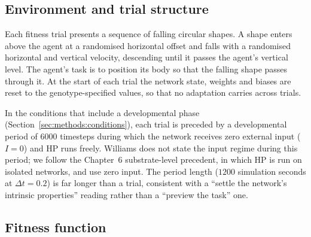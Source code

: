 \subsection{Environment and trial structure}
\label{sec:methods:env}

Each fitness trial presents a sequence of falling circular shapes. A shape
enters above the agent at a randomised horizontal offset and falls with a
randomised horizontal and vertical velocity, descending until it passes the
agent's vertical level. %
The agent's task is to position its body so that the falling shape passes
through it. At the start of each trial the network state, weights and biases are
reset to the genotype-specified values, so that no adaptation carries across
trials.

In the conditions that include a developmental phase
(Section~\ref{sec:methods:conditions}), each trial is preceded by a
developmental period of $6000$ timesteps during which the network
receives zero external input ($I = 0$) and HP runs freely. Williams does not
state the input regime during this period; we follow the Chapter~6 substrate-level
precedent, in which HP is run on isolated networks, and use zero input. The
period length ($1200$ simulation seconds at $\Delta t = 0.2$) is far longer than
a trial, consistent with a ``settle the network's intrinsic properties''
reading rather than a ``preview the task'' one.

\subsection{Fitness function}
\label{sec:methods:fitness}


